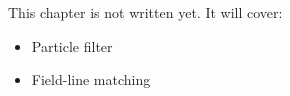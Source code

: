 \label{ch:ctl5}
\begin{keyidea}
This chapter is not written yet. It will cover:
\begin{itemize}[nosep]
  \item Particle filter
  \item Field-line matching
\end{itemize}
\end{keyidea}
